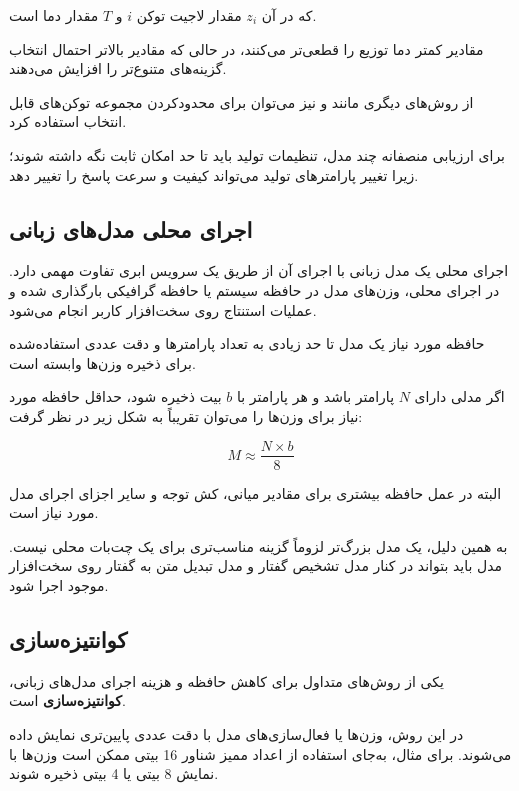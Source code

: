 که در آن $z_i$ مقدار لاجیت
توکن $i$ و $T$ مقدار دما است.

مقادیر کمتر دما توزیع را قطعی‌تر می‌کنند، در حالی که مقادیر
بالاتر احتمال انتخاب گزینه‌های متنوع‌تر را افزایش می‌دهند.

از روش‌های دیگری مانند
و
نیز می‌توان برای محدودکردن مجموعه توکن‌های قابل انتخاب
استفاده کرد.

برای ارزیابی منصفانه چند مدل، تنظیمات تولید باید تا حد امکان
ثابت نگه داشته شوند؛ زیرا تغییر پارامترهای تولید می‌تواند
کیفیت و سرعت پاسخ را تغییر دهد.


\subsection{اجرای محلی مدل‌های زبانی}

اجرای محلی یک مدل زبانی با اجرای آن از طریق یک سرویس ابری
تفاوت مهمی دارد.
در اجرای محلی، وزن‌های مدل در حافظه سیستم یا حافظه گرافیکی
بارگذاری شده و عملیات استنتاج روی سخت‌افزار کاربر انجام می‌شود.

حافظه مورد نیاز یک مدل تا حد زیادی به تعداد پارامترها و
دقت عددی
استفاده‌شده برای ذخیره وزن‌ها وابسته است.

اگر مدلی دارای $N$ پارامتر باشد و هر پارامتر با $b$ بیت ذخیره
شود، حداقل حافظه مورد نیاز برای وزن‌ها را می‌توان تقریباً به شکل
زیر در نظر گرفت:

\begin{equation}
M
\approx
\frac{N \times b}{8}
\end{equation}

البته در عمل حافظه بیشتری برای مقادیر میانی، کش توجه و سایر
اجزای اجرای مدل مورد نیاز است.

به همین دلیل، یک مدل بزرگ‌تر لزوماً گزینه مناسب‌تری برای یک
چت‌بات محلی نیست.
مدل باید بتواند در کنار مدل تشخیص گفتار و مدل تبدیل متن به
گفتار روی سخت‌افزار موجود اجرا شود.


\subsection{کوانتیزه‌سازی}

یکی از روش‌های متداول برای کاهش حافظه و هزینه اجرای مدل‌های
زبانی،
\textbf{کوانتیزه‌سازی}
است.

در این روش، وزن‌ها یا فعال‌سازی‌های مدل با دقت عددی پایین‌تری
نمایش داده می‌شوند.
برای مثال، به‌جای استفاده از اعداد ممیز شناور 16 بیتی ممکن
است وزن‌ها با نمایش 8 بیتی یا 4 بیتی ذخیره شوند.

